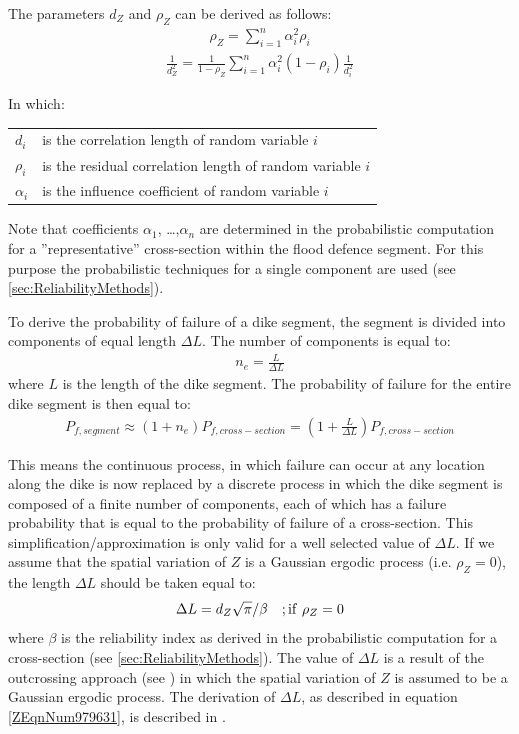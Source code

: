 {The parameters $d_Z$ and $\rho_Z$ can be derived as follows: 
\begin{align}
\rho _{Z} =\sum _{i=1}^{n}\alpha _{i}^{2} \rho _{i}  \label{eq:sm2} 
\end{align}
\begin{align}
\frac{1}{d_{Z}^{2} } =\frac{1}{1-\rho _{Z} } \sum _{i=1}^{n}\alpha _{i}^{2} (1-\rho _{i} )\frac{1}{d_{i}^{2} }  \label{ZEqnNum304048} 
\end{align}

In which: 

\begin{tabular}{p{\textwidth-36pt-125mm}p{120mm}}
$d_i$ & is the correlation length of random variable $i$ \\
$\rho_i$& is the residual correlation length of random variable $i$ \\
$\alpha_i$& is the influence coefficient of random variable $i$ \\
\end{tabular}

Note that coefficients $\alpha_1$, \dots ,$\alpha_n$ are determined in the probabilistic computation for a ''representative'' cross-section within the flood defence segment.
For this purpose the probabilistic techniques for a single component are used (see \autoref{sec:ReliabilityMethods}).

To derive the probability of failure of a dike segment, the segment is divided into components of equal length $\Delta L$.
The number of components is equal to:
\begin{align}
n_{e} =\frac{L}{\Delta L} 
\end{align}
where $L$ is the length of the dike segment.
The probability of failure for the entire dike segment is then equal to:
\begin{align}
P_{f,segment} \approx \left(1+n_{e} \right)P_{f,cross-section} =\left(1+\frac{L}{\Delta L} \right)P_{f,cross-section} \label{ZEqnNum665818} 
\end{align}

This means the continuous process, in which failure can occur at any location along the dike is now replaced by a discrete process in which the dike segment is composed of a finite number of components, each of which has a failure probability that is equal to the probability of failure of a cross-section.
This simplification/approximation is only valid for a well selected value of $\Delta L$.
If we assume that the spatial variation of $Z$ is a Gaussian ergodic process (i.e. $\rho_Z=0$), the length $\Delta L$ should be taken equal to:
\begin{align}
\Delta L=d_{Z} \sqrt{\pi } /\beta \quad ;{\rm if} ~ \rho _{Z} =0\label{ZEqnNum979631} 
\end{align}
where $\beta$ is the reliability index as derived in the probabilistic computation for a cross-section (see \autoref{sec:ReliabilityMethods}).
The value of $\Delta L$ is a result of the outcrossing approach (see ) in which the spatial variation of $Z$ is assumed to be a Gaussian ergodic process.
The derivation of $\Delta L$, as described in equation \eqref{ZEqnNum979631}, is described in \cite{Jongejan2012}.

}
